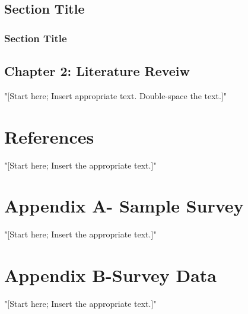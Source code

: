 \documentclass[letterpaper,12pt]{article}
\begin{document}
\subsection {\normalsize Section Title}
{\addtolength{\leftskip}{0.5in}
\subsubsection {\normalsize Section Title}
}
\newpage
\begin{singlespace}
\section{\protect \centering Chapter 2: Literature Reveiw}
\end{singlespace}
\doublespacing
\noindent "[Start here; Insert appropriate text. Double-space the text.]"
\newpage
\section{\protect\centering References}
\doublespacing
"[Start here; Insert the appropriate text.]"
\newpage
\section{\protect\centering Appendix A- Sample Survey}
"[Start here; Insert the appropriate text.]"
\newpage
\section{\protect\centering Appendix B-Survey Data }
"[Start here; Insert the appropriate text.]"
\end{document}
